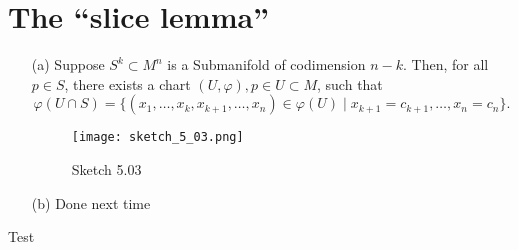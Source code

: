\section{The ``slice lemma''}

\begin{theorem}\label{thm:5.3}
    \begin{enumerate}
        \item[(a)] Suppose \(S^k\subset M^n\) is a Submanifold of codimension \(n-k\).
                   Then, for all \(p\in S\), there exists a chart \((U,\varphi),p\in U\subset M\), such that \[\varphi(U\cap S)=\{(x_1,\dots,x_k,x_{k+1},\dots,x_n)\in \varphi(U)\mid x_{k+1}=c_{k+1},\dots,x_{n}=c_n\}.\]  
        \begin{figure}[H]
            \centering
            \texttt{[image: sketch\_5\_03.png]}
            \caption{Sketch 5.03} 
        \end{figure}
        \item[(b)] Done next time
    \end{enumerate}
\end{theorem}

Test